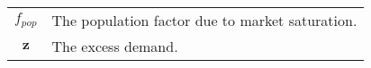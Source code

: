 \documentclass[conference]{IEEEtran}
\theoremstyle{plain}
\begin{document}
{\begin{table}
\begin{tabular}{c|p{.7\linewidth}}
    $f_{pop}$ & The population factor due to market saturation. \\
    $\mathbf{z}$ & The excess demand.\\
    \bottomrule
    \end{tabular}
\end{table} 
}
\end{document}
